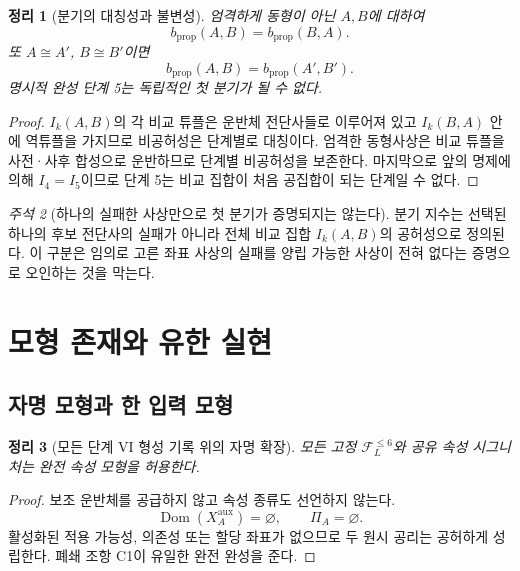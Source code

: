 \documentclass[11pt]{article}
\newcommand{\FVI}{\mathcal F_{L}^{\le 6}}
\newcommand{\Dom}{\operatorname{Dom}}
\newtheorem{theorem}{정리}[section]
\theoremstyle{definition}
\theoremstyle{remark}
\newtheorem{remark}[theorem]{주석}
\begin{document}
\begin{theorem}[분기의 대칭성과 불변성]
\label{thm:branching-invariance}
엄격하게 동형이 아닌 \(A,B\)에 대하여
\[
b_{\mathrm{prop}}(A,B)=b_{\mathrm{prop}}(B,A).
\]
또 \(A\cong A'\), \(B\cong B'\)이면
\[
b_{\mathrm{prop}}(A,B)=b_{\mathrm{prop}}(A',B').
\]
명시적 완성 단계 5는 독립적인 첫 분기가 될 수 없다.
\end{theorem}

\begin{proof}
\(I_k(A,B)\)의 각 비교 튜플은 운반체 전단사들로 이루어져 있고 \(I_k(B,A)\) 안에 역튜플을 가지므로 비공허성은 단계별로 대칭이다.
엄격한 동형사상은 비교 튜플을 사전·사후 합성으로 운반하므로 단계별 비공허성을 보존한다.
마지막으로 앞의 명제에 의해 \(I_4=I_5\)이므로 단계 5는 비교 집합이 처음 공집합이 되는 단계일 수 없다.
\end{proof}

\begin{remark}[하나의 실패한 사상만으로 첫 분기가 증명되지는 않는다]
분기 지수는 선택된 하나의 후보 전단사의 실패가 아니라 전체 비교 집합 \(I_k(A,B)\)의 공허성으로 정의된다.
이 구분은 임의로 고른 좌표 사상의 실패를 양립 가능한 사상이 전혀 없다는 증명으로 오인하는 것을 막는다.
\end{remark}

\section{모형 존재와 유한 실현}
\label{sec:finite}

\subsection{자명 모형과 한 입력 모형}

\begin{theorem}[모든 단계 VI 형성 기록 위의 자명 확장]
\label{thm:trivial-extension}
모든 고정 \(\FVI\)와 공유 속성 시그니처는 완전 속성 모형을 허용한다.
\end{theorem}

\begin{proof}
보조 운반체를 공급하지 않고 속성 종류도 선언하지 않는다.
\[
\Dom(X_A^{\mathrm{aux}})=\varnothing,
\qquad
\Pi_A=\varnothing.
\]
활성화된 적용 가능성, 의존성 또는 할당 좌표가 없으므로 두 원시 공리는 공허하게 성립한다.
폐쇄 조항 C1이 유일한 완전 완성을 준다.
\end{proof}
\end{document}
